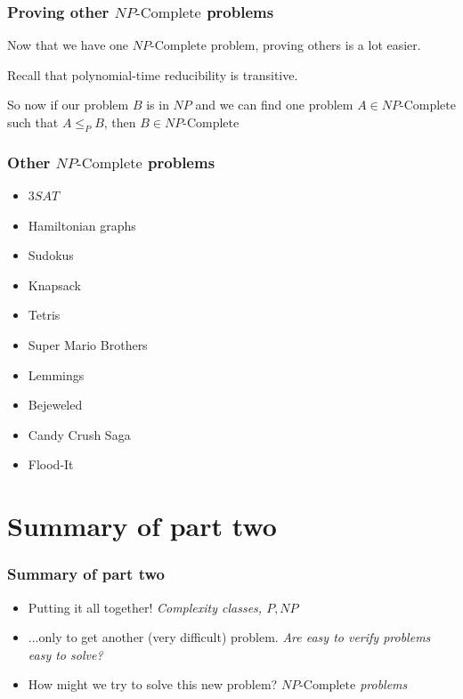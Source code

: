 \documentclass[aspectratio=169]{beamer}
\begin{document}
\begin{frame}
\frametitle{Proving other $NP\text{-Complete}$ problems}

Now that we have one $NP\text{-Complete}$ problem, proving others is a lot easier.

Recall that polynomial-time reducibility is transitive.

So now if our problem $B$ is in $NP$ and we can find one problem $A \in NP\text{-Complete}$ such that $A \leq_P B$, then $B \in NP\text{-Complete}$
\end{frame}

\begin{frame}
\frametitle{Other $NP\text{-Complete}$ problems}
\begin{itemize}
    \item<1-> $3SAT$
    \item<2-> Hamiltonian graphs
    \item<3-> Sudokus
    \item<4-> Knapsack
    \item<5-> Tetris
    \item<6-> Super Mario Brothers
    \item<7-> Lemmings
    \item<8-> Bejeweled
    \item<9-> Candy Crush Saga
    \item<10-> Flood-It
\end{itemize}
\end{frame}

\section{Summary of part two}

\begin{frame}
\frametitle{Summary of part two}
\begin{itemize}
    \item Putting it all together! {\em Complexity classes, $P, NP$}
    \item ...only to get another (very difficult) problem. {\em Are easy to verify problems easy to solve?}
    \item How might we try to solve this new problem? {\em $NP\text{-Complete}$ problems}
\end{itemize}
\end{frame}

\end{document}
